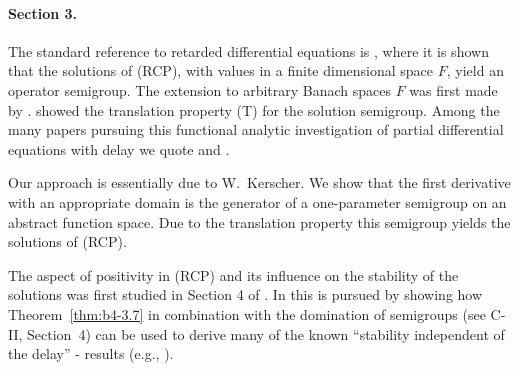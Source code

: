 \paragraph{Section 3.} The standard reference to retarded differential equations is \citet{hale:1977}, where it is shown that the solutions of (RCP), with values in a finite dimensional space $F$, yield an operator semigroup. The extension to arbitrary Banach spaces $F$ was first made by \citet{traviswebb:1974}. \citet{plant:1977} showed the translation property (T) for the solution semigroup. 
Among the many papers pursuing this functional analytic investigation of partial differential equations with delay we quote \citet{diblasiokunischsinestrari:1984} and \citet{kunischschappacher:1983}.

Our approach is essentially due to W.~Kerscher. We show that the first derivative with an appropriate domain is the generator of a one-parameter semigroup on an abstract function space. Due to the translation property this semigroup yields the solutions of (RCP).

The aspect of positivity in (RCP) and its influence on the stability of the solutions was first studied in Section 4 of \citet{kerschernagel:1984}. In \citet{kerscher:1986} this is pursued by showing how Theorem~\ref{thm:b4-3.7} in combination with the domination of semigroups (see C-II, Section~4) can be used to derive many of the known \enquote{stability independent of the delay} - results (e.g., \citet{cookeferreira:1983}).






